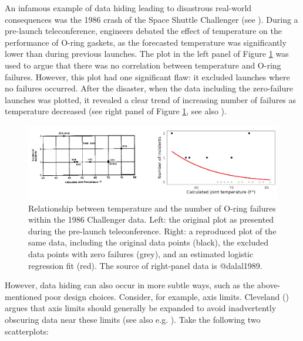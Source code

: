 \documentclass[
]{book}
\theoremstyle{definition}
\theoremstyle{definition}
\theoremstyle{definition}
\theoremstyle{definition}
\theoremstyle{remark}
\begin{document}
An infamous example of data hiding leading to disastrous real-world consequences was the 1986 crash of the Space Shuttle Challenger (see ). During a pre-launch teleconference, engineers debated the effect of temperature on the performance of O-ring gaskets, as the forecasted temperature was significantly lower than during previous launches. The plot in the left panel of Figure \ref{fig:challenger} was used to argue that there was no correlation between temperature and O-ring failures. However, this plot had one significant flaw: it excluded launches where no failures occurred. After the disaster, when the data including the zero-failure launches was plotted, it revealed a clear trend of increasing number of failures as temperature decreased (see right panel of Figure \ref{fig:challenger}, see also ).

\begin{figure}

{\centering \includegraphics[width=1\linewidth,height=1\textheight]{./figures/challenger} 

}

\caption{Relationship between temperature and the number of O-ring failures within the 1986 Challenger data. Left: the original plot as presented during the pre-launch teleconference. Right: a reproduced plot of the same data, including the original data points (black), the excluded data points with zero failures (grey), and an estimated logistic regression fit (red). The source of right-panel data is @dalal1989.}\label{fig:challenger}
\end{figure}

However, data hiding can also occur in more subtle ways, such as the above-mentioned poor design choices. Consider, for example, axis limits. Cleveland () argues that axis limits should generally be expanded to avoid inadvertently obscuring data near these limits (see also e.g. ). Take the following two scatterplots:
\end{document}
